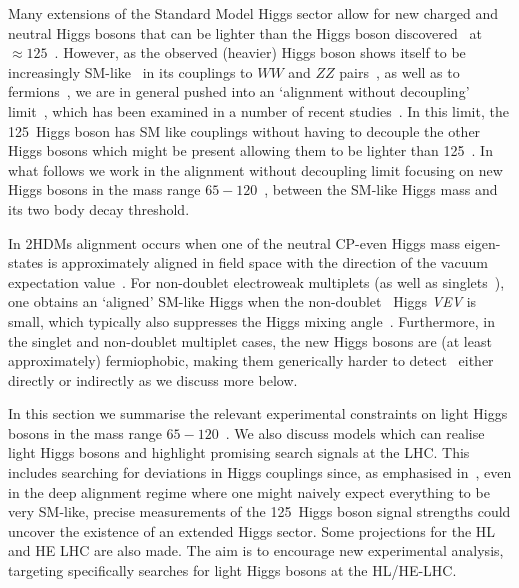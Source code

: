 \documentclass[../report.tex]{subfiles}
\begin{document}
Many extensions of the Standard Model Higgs sector allow for new
charged and neutral Higgs bosons that can be lighter than the Higgs
boson discovered~\cite{Aad:2012tfa,Chatrchyan:2012xdj} at $\approx 125$~\UGeV. 
However, as the observed (heavier) Higgs boson shows itself to be 
increasingly SM-like~\cite{Falkowski:2013dza} in its couplings to $WW$
and $ZZ$ pairs~\cite{Khachatryan:2014kca,Khachatryan:2016vau,Sirunyan:2017exp,Sirunyan:2017tqd,Aaboud:2017oem,Falkowski:2013dza},
as well as to fermions~\cite{Aaboud:2018zhk,CMS:2018abb}, we are in
general pushed into an `alignment without decoupling'
limit~\cite{Gunion:2002zf,Carena:2013ooa}, which has been examined in a
number of recent
studies~\cite{Craig:2013hca,Carena:2014nza,Carena:2015moc,Bernon:2015wef,Profumo:2016zxo,Bechtle:2016kui,Haber:2017erd,Bahl:2018zmf}. In
this limit, the 125~\UGeV Higgs boson has SM like couplings without having
to decouple the other Higgs bosons which might be present allowing them
to be lighter than 125~\UGeV. In what follows we work in the alignment
without decoupling limit focusing on new Higgs bosons in the mass range
$65 - 120$~\UGeV, between the SM-like Higgs mass and its two body decay
threshold. 

In 2HDMs alignment occurs when one of the
neutral CP-even Higgs mass eigen-states is approximately aligned in field
space with the direction of the vacuum expectation value~\cite{Carena:2013ooa,Bernon:2015wef}. For non-doublet
electroweak multiplets (as well as singlets~\cite{Robens:2015gla}), one
obtains an `aligned' SM-like Higgs when the
non-doublet~\cite{Georgi:1985nv,Killick:2013mya} Higgs \emph{VEV} is
small, which typically also suppresses the Higgs mixing
angle~\cite{Haber:1978jt,Hartling:2014zca}. Furthermore, in the singlet
and non-doublet multiplet cases, the new Higgs bosons are (at least
approximately) fermiophobic, making them generically harder to
detect~\cite{Akeroyd:1998ui,Akeroyd:1995hg,Delgado:2016arn,Vega:2018ddp}
either directly or indirectly as we discuss more below.  

In this section we summarise the relevant experimental constraints on
light Higgs bosons in the mass range $65 - 120$~\UGeV. We also discuss
models which can realise light Higgs bosons and highlight promising
search signals at the LHC. This includes searching for deviations in
Higgs couplings since, as emphasised in~\cite{Bernon:2015wef}, even in
the deep alignment regime where one might naively expect everything to
be very SM-like, precise measurements of the 125~\UGeV Higgs boson signal
strengths could uncover the existence of an extended Higgs sector. Some
projections for the HL and HE LHC are also made. 
The aim is to encourage new experimental analysis, targeting
specifically searches for light Higgs bosons at the HL/HE-LHC.
\end{document}
